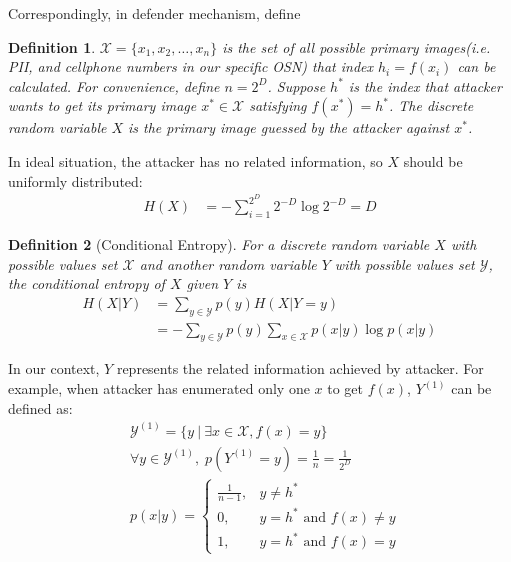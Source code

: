 \documentclass[10pt, conference, compsocconf]{IEEEtran}
\newtheorem{mydef}{Definition}
\begin{document}
		Correspondingly, in defender mechanism, define
		\begin{mydef}\label{def2}
			$\mathcal{X} = \{x_1, x_2, \ldots, x_n\}$ is the set of all possible 
			primary images(i.e. PII, and cellphone numbers
			in our specific OSN) that index $h_i = f(x_i)$ can be calculated.
			For convenience, define $n = 2^D$.
			Suppose $h^*$ is the index that attacker wants to
			get its primary image $x^* \in \mathcal{X}$ satisfying $f(x^*) = h^*$.
			The discrete random variable $X$ is the
			primary image guessed by the attacker against $x^*$. 
		\end{mydef}
		
		In ideal situation, the attacker has no related information, so $X$ should
		be uniformly distributed:
		\begin{align*}
			H(X) &= -\sum_{i=1}^{2^D} 2^{-D} \log 2^{-D}
				= D
		\end{align*}
		
		\begin{mydef}[Conditional Entropy]\label{def_con_entropy}
			For a discrete random variable $X$ with
			possible values set $\mathcal X$ and another random
			variable $Y$ with possible values
			set $\mathcal{Y}$, the conditional entropy
			of $X$ given $Y$ is
			\begin{align}
				H(X|Y) &= \sum_{y \in \mathcal Y} p(y) H(X | Y = y)\\
					&= -\sum_{y \in \mathcal Y} p(y) \sum_{x \in \mathcal X} p(x|y) \log p(x|y)
			\end{align}
		\end{mydef}
		
		In our context, $Y$ represents the related information
		achieved by attacker. For example, when attacker has enumerated only one
		$x$ to get $f(x)$, $Y^{(1)}$ can be defined as:
		\begin{align*}
			&\mathcal Y^{(1)} = \{y \: | \: \exists x \in \mathcal X, f(x) = y\}\\
			&\forall y \in \mathcal Y^{(1)}, \; p(Y^{(1)} = y) = \frac{1}{n} = \frac{1}{2^D}\\
			&p(x|y) = \begin{cases}
				\frac{1}{n-1}, &y \neq h^*\\
				0, &y = h^* \text{ and } f(x) \neq y\\
				1, &y = h^* \text{ and } f(x) = y
			\end{cases}
		\end{align*}
		
\end{document}
